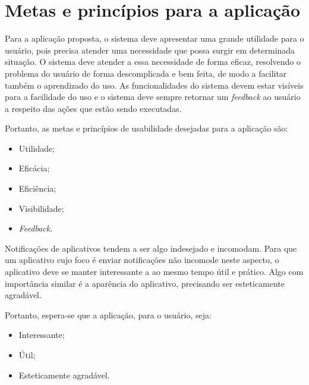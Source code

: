    \section{Metas e princípios para a aplicação}
    
      Para a aplicação proposta, o sistema deve apresentar uma grande utilidade para o usuário, pois precisa atender uma necessidade
      que possa surgir em determinada situação. O sistema deve atender a essa necessidade de forma eficaz, resolvendo o problema
      do usuário de forma descomplicada e bem feita, de modo a facilitar também o aprendizado do uso. As funcionalidades do sistema
      devem estar visíveis para a facilidade do uso e o sistema deve sempre retornar um \textit{feedback} ao usuário a respeito
      das ações que estão sendo executadas.
      
      Portanto, as metas e princípios de usabilidade desejadas para a aplicação são:
      
      \begin{itemize}
	\item Utilidade;
	\item Eficácia;
	\item Eficiência;
	\item Visibilidade;
	\item \textit{Feedback}.
      \end{itemize}
    
      Notificações de aplicativos tendem a ser algo indesejado e incomodam. Para que um aplicativo cujo foco é enviar notificações
      não incomode neste aspecto, o aplicativo deve se manter interessante a ao mesmo tempo útil e prático. Algo com importância similar
      é a aparência do aplicativo, precisando ser esteticamente agradável.
      
      Portanto, espera-se que a aplicação, para o usuário, seja:
      
      \begin{itemize}
       \item Interessante;
       \item Útil;
       \item Esteticamente agradável.
     \end{itemize}

      
    